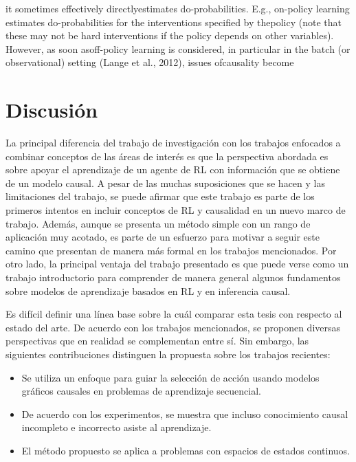 it sometimes effectively directlyestimates do-probabilities.  E.g., on-policy learning estimates do-probabilities for the interventions specified by thepolicy (note that these may not be hard interventions if the policy depends on other variables). However, as soon asoff-policy learning is considered, in particular in the batch (or observational) setting (Lange et al., 2012), issues ofcausality become

\section{Discusión}

La principal diferencia del trabajo de investigación con los trabajos enfocados a combinar conceptos de las áreas de interés es que la perspectiva abordada es sobre apoyar el aprendizaje de un agente de RL con información que se obtiene de un modelo causal. A pesar de las muchas suposiciones que se hacen y las limitaciones del trabajo, se puede afirmar que este trabajo es parte de los primeros intentos en incluir conceptos de RL y causalidad en un nuevo marco de trabajo. Además, aunque se presenta un método simple con un rango de aplicación muy acotado, es parte de un esfuerzo para motivar a seguir este camino que presentan de manera más formal en los trabajos mencionados. Por otro lado, la principal ventaja del trabajo presentado es que puede verse como un trabajo introductorio para comprender de manera general algunos fundamentos sobre modelos de aprendizaje basados en RL y en inferencia causal.

Es difícil definir una línea base sobre la cuál comparar esta tesis con respecto al estado del arte. De acuerdo con los trabajos mencionados, se proponen diversas perspectivas que en realidad se complementan entre sí. Sin embargo, las siguientes contribuciones distinguen
la propuesta sobre los trabajos recientes:

\begin{itemize}
    \item Se utiliza un enfoque para guiar la selección de acción usando modelos gráficos causales en problemas de aprendizaje secuencial.
    \item De acuerdo con los experimentos, se muestra que incluso conocimiento causal incompleto e incorrecto asiste al aprendizaje.
    \item  El método propuesto se aplica a problemas con espacios de estados continuos.
\end{itemize}

